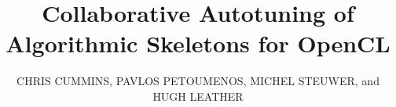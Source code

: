 %
%
%
%






\title{Collaborative Autotuning of Algorithmic Skeletons for OpenCL}

\author{CHRIS CUMMINS, PAVLOS PETOUMENOS, MICHEL STEUWER, and HUGH LEATHER
}

